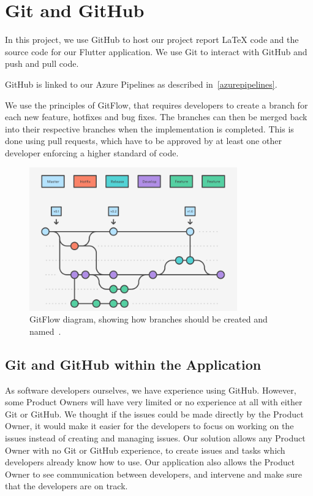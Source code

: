 \section{Git and GitHub}
In this project, we use GitHub to host our project report LaTeX code and the source code for our Flutter application.
We use Git to interact with GitHub and push and pull code. 

GitHub is linked to our Azure Pipelines as described in~\autoref{azurepipelines}.

We use the principles of GitFlow, that requires developers to create a branch for each new feature, hotfixes and bug fixes. 
The branches can then be merged back into their respective branches when the implementation is completed.
This is done using pull requests, which have to be approved by at least one other developer enforcing a higher standard of code.

\begin{figure}[H]
    \centering
    \includegraphics[width=0.8\textwidth]{images/GitFlow.png}
    \caption{GitFlow diagram, showing how branches should be created and named~\cite{GitFlowAtlassian}.}
    \label{Gitflow}
\end{figure}

\subsection{Git and GitHub within the Application}
As software developers ourselves, we have experience using GitHub.
However, some Product Owners will have very limited or no experience at all with either Git or GitHub.
We thought if the issues could be made directly by the Product Owner, it would make it easier for the developers to focus on working on the issues instead of creating and managing issues. 
Our solution allows any Product Owner with no Git or GitHub experience, to create issues and tasks which developers already know how to use.
Our application also allows the Product Owner to see communication between developers, and intervene and make sure that the developers are on track.

